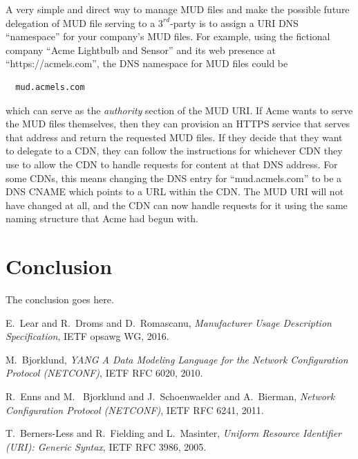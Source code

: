 \documentclass[conference]{IEEEtran}
\begin{document}
A very simple and direct way to manage MUD files and make the possible
future delegation of MUD file serving to a $3^{rd}$-party
is to assign a URI DNS ``namespace'' for your company's MUD files.
For example, using the fictional company ``Acme Lightbulb and Sensor''
and its web presence at ``https://acmels.com'', the DNS namespace for
MUD files could be

{\ttfamily\scriptsize
\begin{verbatim}
  mud.acmels.com
\end{verbatim}
}

\noindent which can serve as the {\em authority} section of the MUD
URI.  If Acme wants to serve the MUD files themselves, then they can
provision an HTTPS service that serves that address and return the
requested MUD files.  If they decide that they want to delegate to a
CDN, they can follow the instructions for whichever CDN they use to
allow the CDN to handle requests for content at that DNS address.  For
some CDNs, this means changing the DNS entry for ``mud.acmels.com'' to
be a DNS CNAME which points to a URL within the CDN.  The MUD URI will
not have changed at all, and the CDN can now handle requests for it
using the same naming structure that Acme had begun with.

\section{Conclusion}
The conclusion goes here.

\begin{thebibliography}{1}

  E.~Lear and R.~Droms and D.~Romascanu, \emph{Manufacturer Usage
    Description Specification}, IETF opsawg WG, 2016.

  M.~Bjorklund, \emph{YANG \- A Data Modeling Language for the Network
  Configuration Protocol (NETCONF)}, IETF RFC 6020, 2010.

 R.~Enns and M.~ Bjorklund and
  J.~Schoenwaelder and A.~Bierman, \emph{Network Configuration
    Protocol (NETCONF)}, IETF RFC 6241, 2011.

 T.~Berners-Less and R.~Fielding and
  L.~Masinter, \emph{Uniform Resource Identifier (URI): Generic
    Syntax}, IETF RFC 3986, 2005.

\end{thebibliography}
\end{document}
